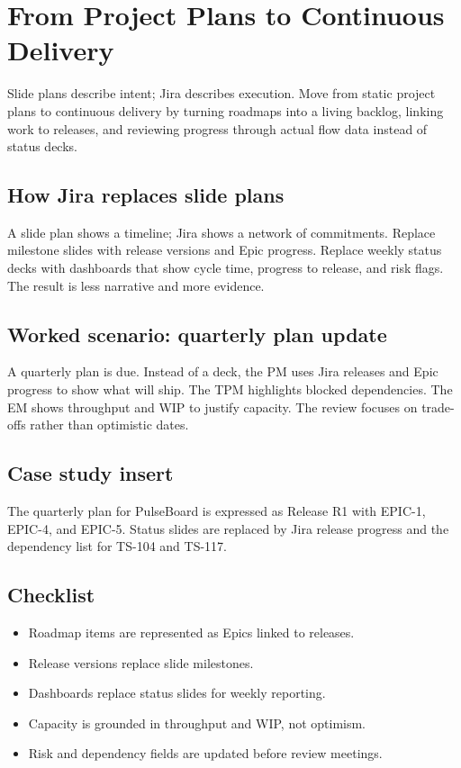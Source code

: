 \section{From Project Plans to Continuous Delivery}
Slide plans describe intent; Jira describes execution. Move from static project plans to continuous delivery by turning roadmaps into a living backlog, linking work to releases, and reviewing progress through actual flow data instead of status decks.

\subsection{How Jira replaces slide plans}
A slide plan shows a timeline; Jira shows a network of commitments. Replace milestone slides with release versions and Epic progress. Replace weekly status decks with dashboards that show cycle time, progress to release, and risk flags. The result is less narrative and more evidence.

\subsection{Worked scenario: quarterly plan update}
A quarterly plan is due. Instead of a deck, the PM uses Jira releases and Epic progress to show what will ship. The TPM highlights blocked dependencies. The EM shows throughput and WIP to justify capacity. The review focuses on trade-offs rather than optimistic dates.

\subsection{Case study insert}
The quarterly plan for PulseBoard is expressed as Release R1 with EPIC-1, EPIC-4, and EPIC-5. Status slides are replaced by Jira release progress and the dependency list for TS-104 and TS-117.
\subsection{Checklist}
\begin{itemize}
  \item Roadmap items are represented as Epics linked to releases.
  \item Release versions replace slide milestones.
  \item Dashboards replace status slides for weekly reporting.
  \item Capacity is grounded in throughput and WIP, not optimism.
  \item Risk and dependency fields are updated before review meetings.
\end{itemize}

